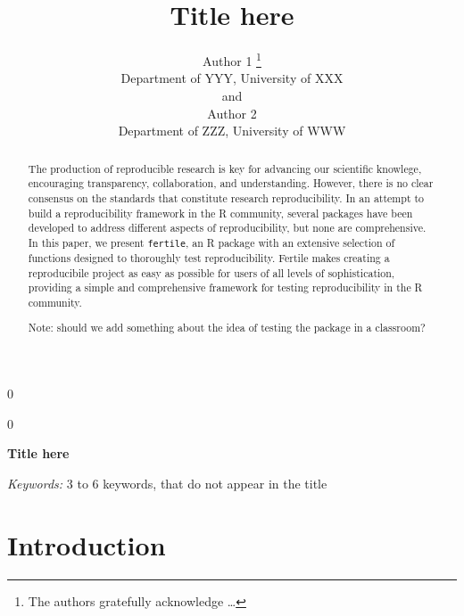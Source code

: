 \documentclass[12pt]{article}
\newcommand{\blind}{0}
\begin{document}
\def\spacingset#1{\renewcommand{\baselinestretch}%
{#1}\small\normalsize} \spacingset{1}



\blind
{
  \title{\bf Title here}

  \author{
        Author 1 \thanks{The authors gratefully acknowledge \ldots{}} \\
    Department of YYY, University of XXX\\
     and \\     Author 2 \\
    Department of ZZZ, University of WWW\\
      }
  \maketitle
} \fi

\blind
{
  \bigskip
  \bigskip
  \bigskip
  \begin{center}
    {\LARGE\bf Title here}
  \end{center}
  \medskip
} \fi

\bigskip
\begin{abstract}
The production of reproducible research is key for advancing our
scientific knowlege, encouraging transparency, collaboration, and
understanding. However, there is no clear consensus on the standards
that constitute research reproducibility. In an attempt to build a
reproducibility framework in the R community, several packages have been
developed to address different aspects of reproducibility, but none are
comprehensive. In this paper, we present \texttt{fertile}, an R package
with an extensive selection of functions designed to thoroughly test
reproducibility. Fertile makes creating a reproducibile project as easy
as possible for users of all levels of sophistication, providing a
simple and comprehensive framework for testing reproducibility in the R
community.

Note: should we add something about the idea of testing the package in a
classroom?
\end{abstract}

\noindent%
{\it Keywords:} 3 to 6 keywords, that do not appear in the title
\vfill

\newpage
\spacingset{1.45} %

\section{Introduction}\label{introduction}
\end{document}
